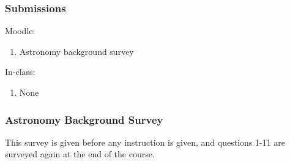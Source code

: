 \documentclass[12pt]{article}
\begin{document}
\subsubsection{Submissions}

Moodle:
\begin{enumerate}
\item Astronomy background survey
\end{enumerate}

\noindent
In-class:
\begin{enumerate}
\item None
\end{enumerate}


\subsubsection{Astronomy Background Survey}

This survey is given before any instruction is given, and questions 1-11 are surveyed again at the end of the course.
\end{document}
